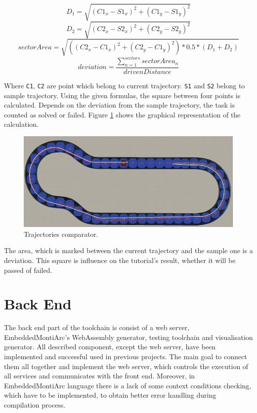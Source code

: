 \begin{equation}
    D_1 = \sqrt{(C1_x - S1_x)^2 + (C1_y - S1_y)^2}
\end{equation}
\begin{equation}
    D_2 = \sqrt{(C2_x - S2_x)^2 + (C2_y - S2_y)^2}
\end{equation}
\begin{equation}
    sectorArea = \sqrt{((C2_x - C1_x)^2 + (C2_y - C1_y)^2) * 0.5 * (D_1 + D_2)}
\end{equation}
\begin{equation}
    deviation = \frac{\sum_{n=1}^{sectors} sectorArea_n}{drivenDistance}
\end{equation}

Where \texttt{C1}, \texttt{C2} are point which belong to current trajectory. \texttt{S1} and \texttt{S2} belong to sample trajectory. Using the given formulas, the square between four points is calculated. Depends on the deviation from the sample trajectory, the task is counted as solved or failed. Figure \ref{fig:trajectory-comparator} shows the graphical representation of the calculation.
\begin{figure}[ht!]
    \centering
    \includegraphics[width=\linewidth]{src/pic/trajectory-comparison}
    \caption{Trajectories comparator.}
    \label{fig:trajectory-comparator}
\end{figure} \newline
The area, which is marked between the current trajectory and the sample one is a deviation. This square is influence on the tutorial's result, whether it will be passed of failed.

\section{Back End}
The back end part of the toolchain is consist of a web server, EmbeddedMontiArc's WebAssembly generator, testing toolchain and visualisation generator. All described component, except the web server, have been implemented and successful used in previous projects. The main goal to connect them all together and implement the web server, which controls the execution of all services and communicates with the front end. Moreover, in EmbeddedMontiArc language there is a lack of some context conditions checking, which have to be implemented, to obtain better error handling during compilation process.

